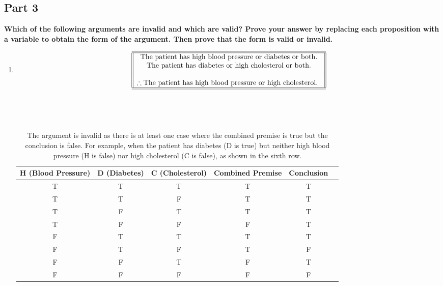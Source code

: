 \documentclass{amsart}
\theoremstyle{definition}
\theoremstyle{Exercise}
\theoremstyle{remark}
\theoremstyle{rule}
\numberwithin{equation}{section}
\begin{document}
\subsection*{Part 3}
{\bf Which of the following arguments are invalid and which are valid? Prove your answer by replacing each proposition with a variable to obtain the form of the argument. Then prove that the form is valid or invalid.}\\
 \begin{enumerate}[label=(\alph*)]
  \item \[
\begin{array}{||c||}
\hline \hline
\text{The patient has high blood pressure or diabetes or both.}\\
\text {The patient has diabetes or high cholesterol or both.}\\
\\
\therefore \text {The patient has high blood pressure or high cholesterol.
}\\
\hline \hline
\end{array}
\]\\\\\
        \begin{table}[h]
          \centering
          \begin{tabular}{cccccc}
            \toprule
            H (Blood Pressure) & D (Diabetes) & C (Cholesterol) & Combined Premise & Conclusion \\
            \midrule
            T                  & T            & T               & T                & T          \\
            T                  & T            & F               & T                & T          \\
            T                  & F            & T               & T                & T          \\
            T                  & F            & F               & F                & T          \\
            F                  & T            & T               & T                & T          \\
            F                  & T            & F               & T                & F          \\
            F                  & F            & T               & F                & T          \\
            F                  & F            & F               & F                & F          \\
            \bottomrule
          \end{tabular}
          \caption{The argument is invalid as there is at least one case where the combined premise is true but the conclusion is false. For example, when the patient has diabetes (D is true) but neither high blood pressure (H is false) nor high cholesterol (C is false), as shown in the sixth row.}
          \label{tab:truth_table_part3}
        \end{table}
\\\\\

 
    \end{enumerate}
\end{document}
